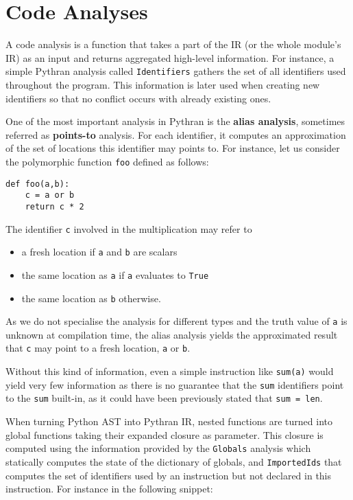 \documentclass[10pt, onecolumn, preprint]{sigplanconf}
\begin{document}
\section{Code Analyses}
\label{sec:analysis}

A code analysis is a function that takes a part of the IR (or the whole
module's IR) as an input and returns aggregated high-level information. For
instance, a simple Pythran analysis called \texttt{Identifiers} gathers the set
of all identifiers used throughout the program. This information is later used
when creating new identifiers so that no conflict occurs with already existing ones.

One of the most important analysis in Pythran is the \textbf{alias analysis}, sometimes
referred as \textbf{points-to} analysis. For each identifier, it computes an
approximation of the set of locations this identifier may points to. For
instance, let us consider the polymorphic function \texttt{foo} defined as follows:

\begin{lstlisting}
def foo(a,b):
    c = a or b
    return c * 2
\end{lstlisting}

The identifier \texttt{c} involved in the multiplication may refer to

\begin{itemize}
    \item a fresh location if \texttt{a} and \texttt{b} are scalars

    \item the same location as \texttt{a} if \texttt{a} evaluates to \texttt{True}

    \item the same location as \texttt{b} otherwise.

\end{itemize}

As we do not specialise the analysis for different types and the truth value of
\texttt{a} is unknown at compilation time, the alias analysis yields %
the approximated result that \texttt{c} may point to a fresh location, 
\texttt{a} or \texttt{b}.

Without this kind of information, even a simple instruction like
\texttt{sum(a)} would yield very few information as there is no guarantee that
the \texttt{sum} identifiers point to the \texttt{sum} built-in, as it could have been 
previously stated that \texttt{sum = len}.

When turning Python AST into Pythran IR, nested functions are turned into global
functions taking their expanded closure as parameter. This closure is computed 
using the information provided by the \texttt{Globals} analysis which 
statically computes the state of the dictionary of globals, and 
\texttt{ImportedIds} that computes the set of %
identifiers used by an instruction but not declared in this instruction. For
instance in the following snippet:
\end{document}
